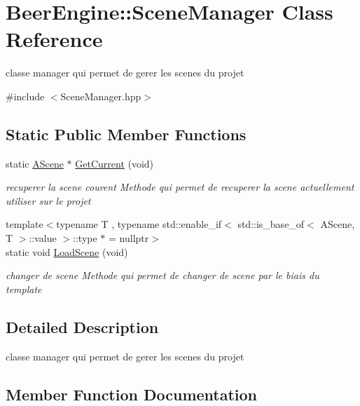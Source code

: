 \hypertarget{class_beer_engine_1_1_scene_manager}{}\section{Beer\+Engine\+:\+:Scene\+Manager Class Reference}
\label{class_beer_engine_1_1_scene_manager}


classe manager qui permet de gerer les scenes du projet  




{\ttfamily \#include $<$Scene\+Manager.\+hpp$>$}

\subsection*{Static Public Member Functions}
\begin{DoxyCompactItemize}
\item 
static \mbox{\hyperlink{class_beer_engine_1_1_a_scene}{A\+Scene}} $\ast$ \mbox{\hyperlink{class_beer_engine_1_1_scene_manager_abf2128f0d4f9e0c77900bddc65237a18}{Get\+Current}} (void)
\begin{DoxyCompactList}\small\item\em recuperer la scene courent Methode qui permet de recuperer la scene actuellement utiliser sur le projet \end{DoxyCompactList}\item 
{\footnotesize template$<$typename T , typename std\+::enable\+\_\+if$<$ std\+::is\+\_\+base\+\_\+of$<$ A\+Scene, T $>$\+::value $>$\+::type $\ast$  = nullptr$>$ }\\static void \mbox{\hyperlink{class_beer_engine_1_1_scene_manager_a9414ed3c9d4a170e198afe83d15db360}{Load\+Scene}} (void)
\begin{DoxyCompactList}\small\item\em changer de scene Methode qui permet de changer de scene par le biais du template \end{DoxyCompactList}\end{DoxyCompactItemize}


\subsection{Detailed Description}
classe manager qui permet de gerer les scenes du projet 

\subsection{Member Function Documentation}
\mbox{\label{class_beer_engine_1_1_scene_manager_abf2128f0d4f9e0c77900bddc65237a18}} 
